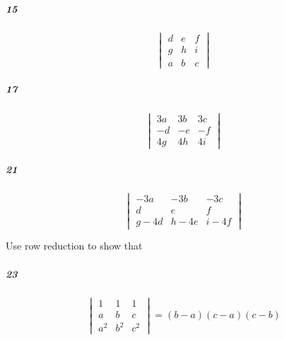 \documentclass[fleqn]{article}
\begin{document}
\subparagraph{15}

\[
\begin{vmatrix} d & e & f \\ g & h & i \\ a & b & c \end{vmatrix} 
\]
\vfill


\pagebreak


\subparagraph{17}

\[
\begin{vmatrix} 3a & 3b & 3c \\ -d & -e & -f \\ 4g & 4h & 4i \end{vmatrix} 
\]
\vfill



\subparagraph{21}

\[
\begin{vmatrix} -3a & -3b & -3c \\ d & e & f \\ g-4d & h-4e & i-4f \end{vmatrix}
\]
\vfill


\pagebreak
 Use row reduction to show that 

\subparagraph{23}

\[
\begin{vmatrix} 1 & 1 & 1 \\ a & b & c \\ a^2 & b^2 & c^2 \end{vmatrix} = (b-a)(c-a)(c-b)
\]
\vfill
\end{document}
